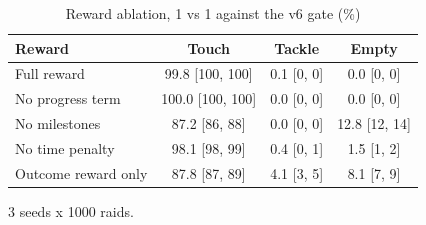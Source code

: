 \begin{table}[t]
\centering
\caption{Reward ablation, 1 vs 1 against the v6 gate (\%)}
\label{tab:T3_reward_ablation}
\begin{tabular}{lccc}
\toprule
Reward & Touch & Tackle & Empty \\
\midrule
Full reward & 99.8 [100, 100] & 0.1 [0, 0] & 0.0 [0, 0] \\
No progress term & 100.0 [100, 100] & 0.0 [0, 0] & 0.0 [0, 0] \\
No milestones & 87.2 [86, 88] & 0.0 [0, 0] & 12.8 [12, 14] \\
No time penalty & 98.1 [98, 99] & 0.4 [0, 1] & 1.5 [1, 2] \\
Outcome reward only & 87.8 [87, 89] & 4.1 [3, 5] & 8.1 [7, 9] \\
\bottomrule
\end{tabular}
\par\smallskip\footnotesize 3 seeds x 1000 raids.
\end{table}
